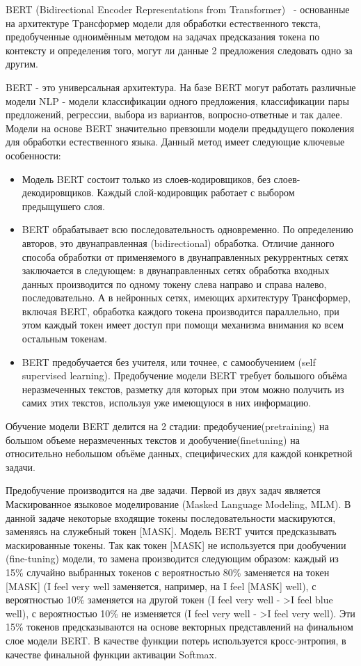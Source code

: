BERT (Bidirectional Encoder Representations from Transformer)~\cite{devlin_2018} - основанные на архитектуре Tрансформер модели для обработки естественного текста, предобученные одноимённым методом на задачах предсказания токена по контексту и определения того, могут ли данные 2 предложения следовать одно за другим. 

BERT - это универсальная архитектура. На базе BERT могут работать различные модели NLP - модели классификации одного предложения, классификации пары предложений, регрессии, выбора из вариантов, вопросно-ответные и так далее. Модели на основе BERT значительно превзошли модели предыдущего поколения для обработки естественного языка. 
Данный метод имеет следующие ключевые особенности:
\begin{itemize}
\item Модель BERT состоит только из слоев-кодировщиков, без слоев-декодировщиков. Каждый слой-кодировщик работает с выбором предыщушего слоя.
\item BERT обрабатывает всю последовательность одновременно. По определению авторов, это двунаправленная (bidirectional) обработка. Отличие данного способа обработки от применяемого в двунаправленных рекуррентных сетях заключается в следующем: в двунаправленных сетях обработка входных данных производится по одному токену слева направо и справа налево, последовательно. А в нейронных сетях, имеющих архитектуру Трансформер, включая BERT, обработка каждого токена производится параллельно, при этом каждый токен имеет доступ при помощи механизма внимания ко всем остальным токенам. 
\item BERT предобучается без учителя, или точнее, с самообучением (self supervised learning). Предобучение модели BERT требует большого объёма неразмеченных текстов, разметку для которых при этом можно получить из самих этих текстов, используя уже имеющуюся в них информацию.
\end{itemize}
Обучение модели BERT делится на 2 стадии: предобучение(pretraining) на большом объеме неразмеченных текстов и дообучение(finetuning) на относительно небольшом объёме данных, специфических для каждой конкретной задачи. 

Предобучение производится на две задачи. Первой из двух задач является Маскированное языковое моделирование (Masked Language Modeling, MLM). В данной задаче некоторые входящие токены последовательности маскируются, заменяясь на служебный токен [MASK]. Модель BERT учится предсказывать маскированные токены. Так как токен [MASK] не используется при дообучении (fine-tuning) модели, то замена производится следующим образом: каждый из 15\% случайно выбранных токенов с вероятностью 80\% заменяется на токен [MASK] (I feel very well заменяется, например, на I feel [MASK] well), с вероятностью 10\% заменяется на другой токен (I feel very well - >I feel blue well), с вероятностью 10\% не изменяется (I feel very well - >I feel very well). Эти 15\% токенов предсказываются на основе векторных представлений на финальном слое модели BERT. В качестве функции потерь используется кросс-энтропия, в качестве финальной функции активации Softmax. 

